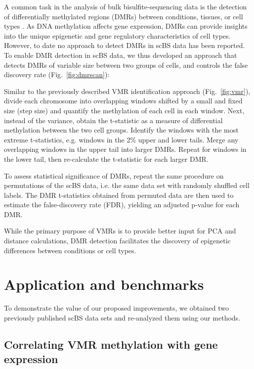 \documentclass[twocolumn,10pt]{article}
\begin{document}
A common task in the analysis of bulk bisulfite-sequencing data is the detection of differentially methylated regions (DMRs) between conditions, tissues, or cell types \citep{Hebestreit2013, dmrseq}.
As DNA methylation affects gene expression, DMRs can provide insights into the unique epigenetic and gene regulatory characteristics of cell types.
However, to date no approach to detect DMRs in scBS data has been reported.
To enable DMR detection in scBS data, we thus developed an approach that detects DMRs of variable size between two groups of cells, and controls the false discovery rate (Fig.~\ref{fig:dmrscan}):

Similar to the previously described VMR identification approach (Fig.~\ref{fig:vmr}), divide each chromosome into overlapping windows shifted by a small and fixed size (step size) and quantify the methylation of each cell in each window.
Next, instead of the variance, obtain the t-statistic %
as a measure of differential methylation between the two cell groups.
Identify the windows with the most extreme t-statistics, e.g. windows in the 2\% upper and lower tails.
Merge any overlapping windows in the upper tail into larger DMRs.
Repeat for windows in the lower tail, then re-calculate the t-statistic for each larger DMR.

To assess statistical significance of DMRs, repeat the same procedure on permutations of the scBS data, i.e. the same data set with randomly shuffled cell labels.
The DMR t-statistics obtained from permuted data are then used to estimate the false-discovery rate (FDR), yielding an adjusted p-value for each DMR.

While the primary purpose of VMRs is to provide better input for PCA and distance calculations, DMR detection facilitates the discovery of epigenetic differences between conditions or cell types.


\section{Application and benchmarks}

To demonstrate the value of our proposed improvements, we obtained two previously published scBS data sets and re-analyzed them using our methods.

\subsection{Correlating VMR methylation with gene expression}
\end{document}
